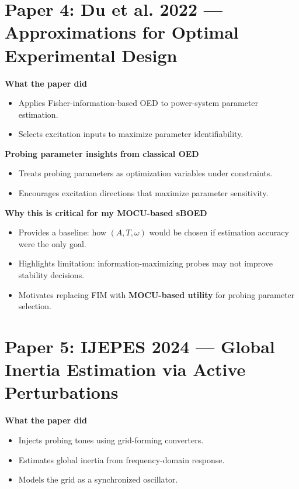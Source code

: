 \documentclass[12pt]{article}
\begin{document}

\newpage
\section*{Paper 4: Du et al. 2022 — Approximations for Optimal Experimental Design \cite{du2022}}

\textbf{What the paper did}
\begin{itemize}
  \item Applies Fisher-information-based OED to power-system parameter estimation.
  \item Selects excitation inputs to maximize parameter identifiability.
\end{itemize}

\textbf{Probing parameter insights from classical OED}
\begin{itemize}
  \item Treats probing parameters as optimization variables under constraints.
  \item Encourages excitation directions that maximize parameter sensitivity.
\end{itemize}

\textbf{Why this is critical for my MOCU-based sBOED}
\begin{itemize}
  \item Provides a baseline: how $(A,T,\omega)$ would be chosen if estimation accuracy were the only goal.
  \item Highlights limitation: information-maximizing probes may not improve stability decisions.
  \item Motivates replacing FIM with \textbf{MOCU-based utility} for probing parameter selection.
\end{itemize}





\newpage
\section*{Paper 5: IJEPES 2024 — Global Inertia Estimation via Active Perturbations \cite{brambilla2024}}

\textbf{What the paper did}
\begin{itemize}
  \item Injects probing tones using grid-forming converters.
  \item Estimates global inertia from frequency-domain response.
  \item Models the grid as a synchronized oscillator.
\end{itemize}
\end{document}

